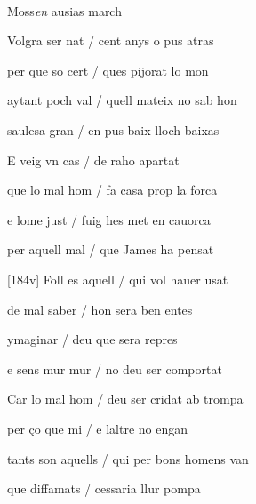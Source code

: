 \documentclass[12pt]{article}
\renewcommand{\espaiAbansEtiquetaPoema}{\vspace{0ex}}
\begin{document}
\begin{estrofa}

\espaiAbansEtiquetaPoema

\\

\begin{rubrica}

Moss\textit{en }ausias march

\end{rubrica}

\end{estrofa}


\begin{estrofa}

 Volgra ser nat / cent anys o pus atras

 per que so cert / ques pijorat lo mon

 aytant poch val / quell mateix no sab hon

 saulesa gran / en pus baix lloch baixas

 E veig vn cas / de raho apartat

 que lo mal hom / fa casa prop la forca

 e lome just / fuig hes met en cauorca

 per aquell mal / que James ha pensat

\end{estrofa}



\begin{estrofa}

 [184v] Foll es aquell / qui vol hauer usat

 de mal saber / hon sera ben entes

 ymaginar / deu que sera repres

 e sens mur mur / no deu ser comportat

 Car lo mal hom / deu ser cridat ab trompa

 per \c{c}o que mi / e laltre no engan

 tants son aquells / qui per bons homens van

 que diffamats / cessaria llur pompa

\end{estrofa}
\end{document}
